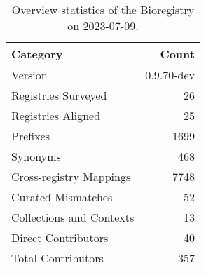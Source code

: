 \begin{table}
\caption{Overview statistics of the Bioregistry on 2023-07-09.}
\label{tab:bioregistry-summary}
\begin{tabular}{lr}
\toprule
Category & Count \\
\midrule
Version & 0.9.70-dev \\
Registries Surveyed & 26 \\
Registries Aligned & 25 \\
Prefixes & 1699 \\
Synonyms & 468 \\
Cross-registry Mappings & 7748 \\
Curated Mismatches & 52 \\
Collections and Contexts & 13 \\
Direct Contributors & 40 \\
Total Contributors & 357 \\
\bottomrule
\end{tabular}
\end{table}
